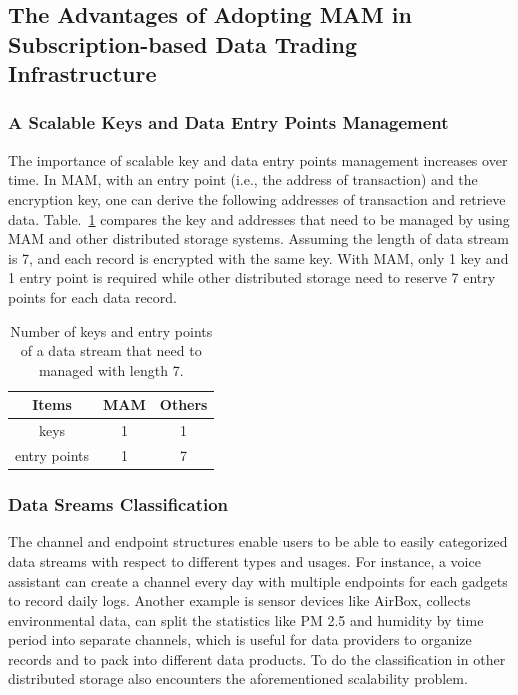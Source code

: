 \documentclass[conference]{IEEEtran}
\begin{document}
\subsection{The Advantages of Adopting MAM in Subscription-based Data Trading Infrastructure}
\subsubsection{A Scalable Keys and Data Entry Points Management}
The importance of scalable key and data entry points management increases over time. In MAM, with an entry point (i.e., the address of transaction) and the encryption key, one can derive the following addresses of transaction and retrieve data. Table.~\ref{tab:mam_scalability} compares the key and addresses that need to be managed by using MAM and other distributed storage systems. Assuming the length of data stream is 7, and each record is encrypted with the same key. With MAM, only 1 key and 1 entry point is required while other distributed storage need to reserve 7 entry points for each data record.

\begin{table}[htbp]
	\caption{Number of keys and entry points of a data stream that need to managed with length 7.}
	\label{tab:mam_scalability}
	\begin{center}
	\begin{tabular}{|c|c|c|}
	\hline
		\textbf{Items} & \textbf{MAM} & \textbf{Others} \\ 
		\hline
		keys & 1 & 1 \\ 
		\hline
		entry points & 1 & 7 \\ 
		\hline
	\end{tabular}
	\end{center}
\end{table}

\subsubsection{Data Sreams Classification}
The channel and endpoint structures enable users to be able to easily categorized data streams with respect to different types and usages. For instance, a voice assistant can create a channel every day with multiple endpoints for each gadgets to record daily logs. Another example is sensor devices like AirBox\cite{LASS}, collects environmental data, can split the statistics like PM 2.5 and humidity by time period into separate channels, which is useful for data providers to organize records and to pack into different data products. To do the classification in other distributed storage also encounters the aforementioned scalability problem.
\end{document}
